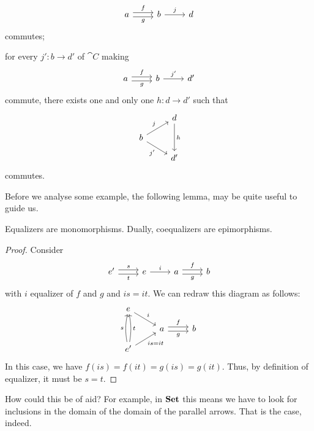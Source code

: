 \begin{definition}
\begin{tcbitem}
\[\begin{tikzcd}
a \ar["f", r, shift left] \ar["g", r, shift right, swap] & b \ar["j", r] & d
\end{tikzcd}\]
commutes;
\item for every \(j' : b \to d'\) of \(\cat C\) making
\[\begin{tikzcd}
a \ar["f", r, shift left] \ar["g", r, shift right, swap] & b \ar["{j'}", r] & d'
\end{tikzcd}\]
commute, there exists one and only one \(h : d \to d'\) such that
\[\begin{tikzcd}[row sep=small]
 & d \ar["h", dd] \\
b \ar["j", ur] \ar["{j'}", dr, swap] \\
 & d'
\end{tikzcd}\]
commutes.
\end{tcbitem}
\end{definition}

Before we analyse some example, the following lemma, may be quite useful to guide us.

\begin{lemma}\label{lemma:EqualizersAreMonos}
Equalizers are monomorphisms. Dually, coequalizers are epimorphisms.
\end{lemma}

\begin{proof}
Consider
\[\begin{tikzcd}
e' \ar["s", r, shift left] \ar["t", r, shift right, swap] & e \ar["i", r] & a \ar["f", r, shift left] \ar["g", r, shift right, swap] & b
\end{tikzcd}\]
with \(i\) equalizer of \(f\) and \(g\) and \(is = it\). We can redraw this diagram as follows:
\[\begin{tikzcd}[row sep=small]
e \ar["i", dr] \\
 & a \ar["f", r, shift left] \ar["g", r, shift right, swap] & b \\
e' \ar["s", uu, bend left=10] \ar["t", uu, bend right=10, swap] \ar["{is = it}", ur, swap]
\end{tikzcd}\]
In this case, we have \(f(is) = f(it) = g(is) = g(it)\). Thus, by definition of equalizer, it must be \(s = t\).
\end{proof}

How could this be of aid? For example, in \(\mathbf{Set}\) this means we have to look for inclusions in the domain of the domain of the parallel arrows. That is the case, indeed.

